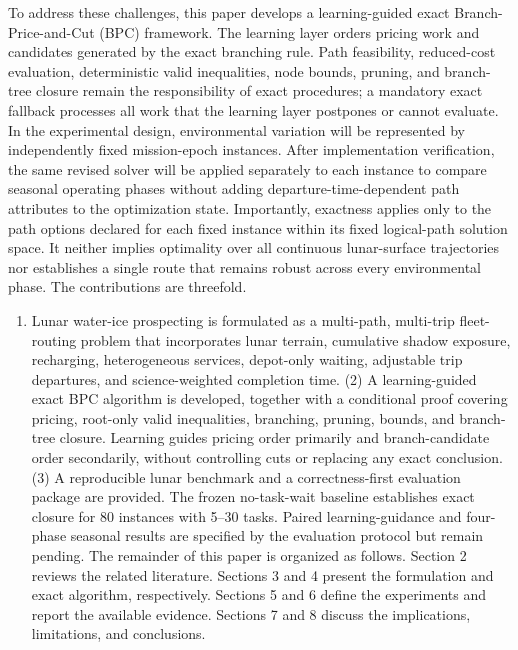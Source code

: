 \documentclass[
  11pt,
]{article}
\providecommand{\tightlist}{%
  \setlength{\itemsep}{0pt}\setlength{\parskip}{0pt}}
\begin{document}
To address these challenges, this paper develops a learning-guided exact
Branch-Price-and-Cut (BPC) framework. The learning layer orders pricing
work and candidates generated by the exact branching rule. Path
feasibility, reduced-cost evaluation, deterministic valid inequalities,
node bounds, pruning, and branch-tree closure remain the responsibility
of exact procedures; a mandatory exact fallback processes all work that
the learning layer postpones or cannot evaluate. In the experimental
design, environmental variation will be represented by independently
fixed mission-epoch instances. After implementation verification, the
same revised solver will be applied separately to each instance to
compare seasonal operating phases without adding
departure-time-dependent path attributes to the optimization state.
Importantly, exactness applies only to the path options declared for
each fixed instance within its fixed logical-path solution space. It
neither implies optimality over all continuous lunar-surface
trajectories nor establishes a single route that remains robust across
every environmental phase. The contributions are threefold.

\begin{enumerate}
\def\labelenumi{(\arabic{enumi})}
\tightlist
\item
  Lunar water-ice prospecting is formulated as a multi-path, multi-trip
  fleet-routing problem that incorporates lunar terrain, cumulative
  shadow exposure, recharging, heterogeneous services, depot-only
  waiting, adjustable trip departures, and science-weighted completion
  time. (2) A learning-guided exact BPC algorithm is developed, together
  with a conditional proof covering pricing, root-only valid
  inequalities, branching, pruning, bounds, and branch-tree closure.
  Learning guides pricing order primarily and branch-candidate order
  secondarily, without controlling cuts or replacing any exact
  conclusion. (3) A reproducible lunar benchmark and a correctness-first
  evaluation package are provided. The frozen no-task-wait baseline
  establishes exact closure for 80 instances with 5--30 tasks. Paired
  learning-guidance and four-phase seasonal results are specified by the
  evaluation protocol but remain pending. The remainder of this paper is
  organized as follows. Section 2 reviews the related literature.
  Sections 3 and 4 present the formulation and exact algorithm,
  respectively. Sections 5 and 6 define the experiments and report the
  available evidence. Sections 7 and 8 discuss the implications,
  limitations, and conclusions.
\end{enumerate}
\end{document}

